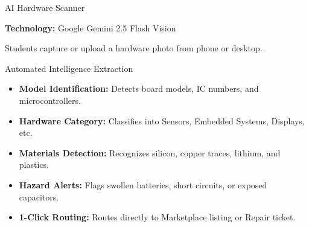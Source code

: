 \documentclass{beamer}
\begin{document}

\begin{frame}{AI Hardware Scanner}

\textbf{Technology:} Google Gemini 2.5 Flash Vision

\vspace{0.2cm}
Students capture or upload a hardware photo from phone or desktop.

\vspace{0.25cm}
\begin{block}{Automated Intelligence Extraction}
\begin{itemize}
    \setlength\itemsep{0.2cm}
    \item \textbf{Model Identification:} Detects board models, IC numbers, and microcontrollers.
    \item \textbf{Hardware Category:} Classifies into Sensors, Embedded Systems, Displays, etc.
    \item \textbf{Materials Detection:} Recognizes silicon, copper traces, lithium, and plastics.
    \item \textbf{Hazard Alerts:} Flags swollen batteries, short circuits, or exposed capacitors.
    \item \textbf{1-Click Routing:} Routes directly to Marketplace listing or Repair ticket.
\end{itemize}
\end{block}

\end{frame}

\end{document}
